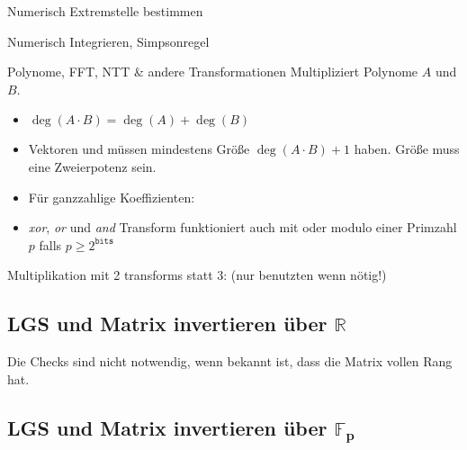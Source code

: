 \begin{algorithm}{Numerisch Extremstelle bestimmen}
\end{algorithm}


\begin{algorithm}{Numerisch Integrieren, Simpsonregel}
\end{algorithm}

\begin{algorithm}{Polynome, FFT, NTT \& andere Transformationen}
	Multipliziert Polynome $A$ und $B$.
	\begin{itemize}
		\item $\deg(A \cdot B) = \deg(A) + \deg(B)$
		\item Vektoren  und  müssen mindestens Größe
		$\deg(A \cdot B) + 1$ haben.
		Größe muss eine Zweierpotenz sein.
		\item Für ganzzahlige Koeffizienten: 
		\item \emph{xor}, \emph{or} und \emph{and} Transform funktioniert auch mit  oder modulo einer Primzahl $p$ falls $p \geq 2^{\texttt{bits}}$
	\end{itemize}
	Multiplikation mit 2 transforms statt 3: (nur benutzten wenn nötig!)
\end{algorithm}

\subsection{LGS und Matrix invertieren über $\boldsymbol{\mathbb{R}}$}
Die Checks sind nicht notwendig, wenn bekannt ist, dass die Matrix vollen Rang hat.

\subsection{LGS und Matrix invertieren über $\boldsymbol{\mathbb{F}_p}$}

